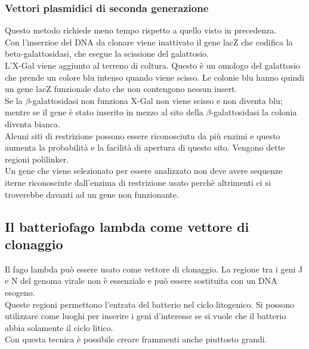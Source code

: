 \subsubsection{Vettori plasmidici di seconda generazione}
Questo metodo richiede meno tempo rispetto a quello visto in precedenza. 
\\Con l'inserzioe del DNA da clonare viene inattivato il gene lacZ che codifica la beta-galattosidasi, che esegue la scissione del galattosio. 
\\L'X-Gal viene aggiunto al terreno di coltura. Questo è un omologo del galattosio che prende un colore blu intenso quando viene scisso. Le colonie blu hanno quindi un gene lacZ funzionale dato che non contengono nessun insert. 
\\Se la $\beta$-galattosidasi non funziona X-Gal non viene scisso e non diventa blu; mentre se il gene è stato inserito in mezzo al sito della $\beta$-galattosidasi la colonia diventa bianca. 
\\Alcuni siti di restrizione possono essere riconosciutu da più enzimi e questo aumenta la probabilità e la facilità di apertura di questo sito. Vengono dette regioni polilinker. 
\\Un gene che viene selezionato per essere analizzato non deve avere sequenze iterne riconosciute dall'enzima di restrizione usato perchè altrimenti ci si troverebbe davanti ad un gene non funzionante. 
\subsection{Il batteriofago lambda come vettore di clonaggio}
Il fago lambda può essere usato come vettore di clonaggio. La regione tra i geni J e N del genoma virale non è essenziale e può essere sostituita con un DNA esogeno. 
\\Queste regioni permettono l'entrata del batterio nel ciclo litogenico. Si possono utilizzare come luoghi per inserire i geni d'interesse se si vuole che il batterio abbia solamente il ciclo litico. 
\\Con questa tecnica è possibile creare frammenti anche piuttosto grandi.
